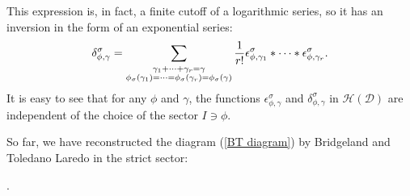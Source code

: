 \documentclass[a4paper,12pt]{amsart}
\numberwithin{equation}{section}
\newcommand{\1}{\mathbf{1}}
\begin{document}
This expression is, in fact, a finite cutoff of a logarithmic series, so it has an inversion in the form of an exponential series:
\begin{equation}
    \label{Joyce inversion}
    \delta^\sigma_{\phi,\gamma}=\sum_{\begin{subarray}{c}
    \\ \gamma_1+\dots+\gamma_r=\gamma\\
   \phi_\sigma(\gamma_1)=\dots=\phi_\sigma(\gamma_r)=\phi_\sigma(\gamma) 
\end{subarray}}\frac{1}{r!}\epsilon^\sigma_{\phi,\gamma_1}*\dots*\epsilon^\sigma_{\phi,\gamma_r}.
\end{equation}
It is easy to see that for any $\phi$ and $\gamma$, the functions $\epsilon^\sigma_{\phi,\gamma}$ and $\delta^\sigma_{\phi,\gamma}$ in $\mathcal{H}(\mathcal{D})$ are independent of the choice of the sector $I\ni\phi$.

So far, we have reconstructed the diagram (\ref{BT diagram}) by Bridgeland and Toledano Laredo in the strict sector:
\begin{center}
    .
\end{center}
\end{document}
